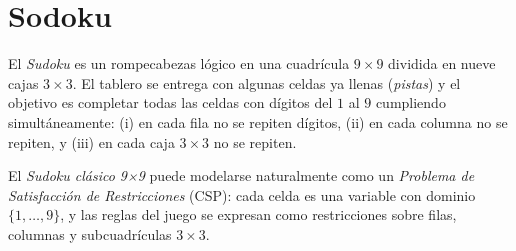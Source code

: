
\section{Sodoku}
El \emph{Sudoku} es un rompecabezas lógico en una cuadrícula \(9\times9\) dividida en nueve cajas \(3\times3\). El tablero se entrega con algunas celdas ya llenas (\emph{pistas}) y el objetivo es completar todas las celdas con dígitos del \(1\) al \(9\) cumpliendo simultáneamente: (i) en cada fila no se repiten dígitos, (ii) en cada columna no se repiten, y (iii) en cada caja \(3\times3\) no se repiten.

El \emph{Sudoku clásico 9×9} puede modelarse naturalmente como un \emph{Problema de Satisfacción de Restricciones} (CSP): cada celda es una variable con dominio \(\{1,\dots,9\}\), y las reglas del juego se expresan como restricciones sobre filas, columnas y subcuadrículas \(3\times3\).

